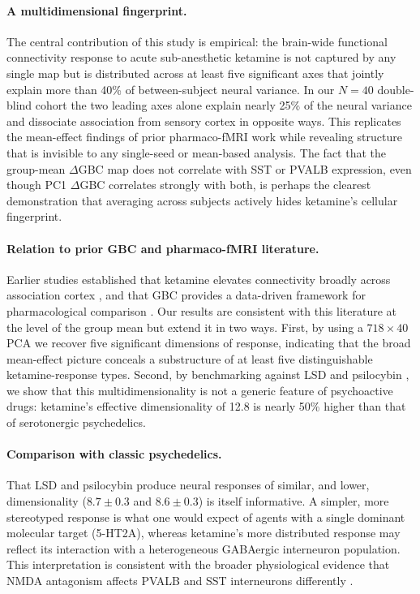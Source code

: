 \documentclass[11pt]{article}
\begin{document}
\paragraph{A multidimensional fingerprint.} The central contribution of this
study is empirical: the brain-wide functional connectivity response to
acute sub-anesthetic ketamine is not captured by any single map but is
distributed across at least five significant axes that jointly explain more
than 40\% of between-subject neural variance. In our $N=40$ double-blind
cohort the two leading axes alone explain nearly 25\% of the neural
variance and dissociate association from sensory cortex in opposite ways.
This replicates the mean-effect findings of prior pharmaco-fMRI work
\citep{driesen2013relationship,anticevic2014ncs,abdallah2018ketamine} while
revealing structure that is invisible to any single-seed or mean-based
analysis. The fact that the group-mean $\Delta$GBC map does not correlate
with SST or PVALB expression, even though PC1 $\Delta$GBC correlates
strongly with both, is perhaps the clearest demonstration that averaging
across subjects actively hides ketamine's cellular fingerprint.

\paragraph{Relation to prior GBC and pharmaco-fMRI literature.} Earlier
studies established that ketamine elevates connectivity broadly across
association cortex \citep{driesen2013relationship,anticevic2014ncs}, and
that GBC provides a data-driven framework for pharmacological comparison
\citep{cole2010globalbrain,abdallah2018ketamine}. Our results are consistent
with this literature at the level of the group mean but extend it in two
ways. First, by using a $718 \times 40$ PCA we recover five significant
dimensions of response, indicating that the broad mean-effect picture
conceals a substructure of at least five distinguishable ketamine-response
types. Second, by benchmarking against LSD and psilocybin
\citep{carhart2016neural,preller2020psilocybin,preller2018effective}, we
show that this multidimensionality is not a generic feature of psychoactive
drugs: ketamine's effective dimensionality of 12.8 is nearly 50\% higher
than that of serotonergic psychedelics.

\paragraph{Comparison with classic psychedelics.} That LSD and psilocybin
produce neural responses of similar, and lower, dimensionality
($8.7\pm0.3$ and $8.6\pm0.3$) is itself informative. A simpler, more
stereotyped response is what one would expect of agents with a single
dominant molecular target (5-HT2A), whereas ketamine's more distributed
response may reflect its interaction with a heterogeneous GABAergic
interneuron population. This interpretation is consistent with the broader
physiological evidence that NMDA antagonism affects PVALB and SST
interneurons differently
\citep{homayoun2007nmda,rudy2011three,tremblay2016gabaergic}.
\end{document}
